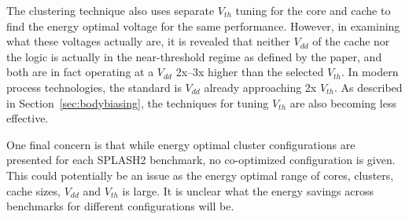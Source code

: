 The clustering technique also uses separate $V_{th}$ tuning for the core and
cache to find the energy optimal voltage for the same performance. However, in
examining what these voltages actually are, it is revealed that neither $V_{dd}$
of the cache nor the logic is actually in the near-threshold regime as defined
by the paper, and both are in fact operating at a $V_{dd}$ 2x--3x higher than
the selected $V_{th}$. In modern process technologies, the standard is $V_{dd}$
already approaching 2x $V_{th}$. As described in Section~\ref{sec:bodybiasing},
the techniques for tuning $V_{th}$ are also becoming less effective.

One final concern is that while energy optimal cluster configurations are
presented for each SPLASH2 benchmark, no co-optimized configuration is given.
This could potentially be an issue as the energy optimal range of cores,
clusters, cache sizes, $V_{dd}$ and $V_{th}$ is large. It is unclear what the
energy savings across benchmarks for different configurations will be.
